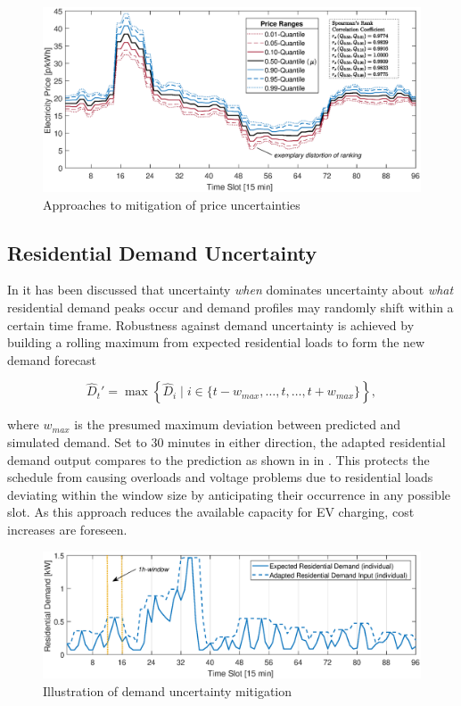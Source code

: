 \begin{figure}[]
	\includegraphics[width=\textwidth,trim={2.1cm 0cm 2.1cm 0.2cm},clip]{figures/mitigation/pr_mit.eps}
	\caption{Approaches to mitigation of price uncertainties}
	\label{fig:pr_mit}
\end{figure}

\subsection{Residential Demand Uncertainty}

In  it has been discussed that uncertainty \textit{when} dominates uncertainty about \textit{what} residential demand peaks occur and demand profiles may randomly shift within a certain time frame. Robustness against demand uncertainty is achieved by building a rolling maximum from expected residential loads to form the new demand forecast

\begin{equation}
\hat{D}_t' = \max \left\{\hat{D}_i \;|\; i \in \{t-w_{max},\dots,t,\dots,t+w_{max}\}\right\},
\end{equation}

where $w_{max}$ is the presumed maximum deviation between predicted and simulated demand. Set to 30 minutes in either direction, the adapted residential demand output compares to the prediction as shown in in . This protects the schedule from causing overloads and voltage problems due to residential loads deviating within the window size by anticipating their occurrence in any possible slot. As this approach reduces the available capacity for EV charging, cost increases are foreseen. 

\begin{figure}[]
	\includegraphics[width=\textwidth,trim={2.1cm 0cm 2.1cm 0.2cm},clip]{figures/mitigation/dem_mit.eps}
	\caption{Illustration of demand uncertainty mitigation}
	\label{fig:dem_mit}
\end{figure}